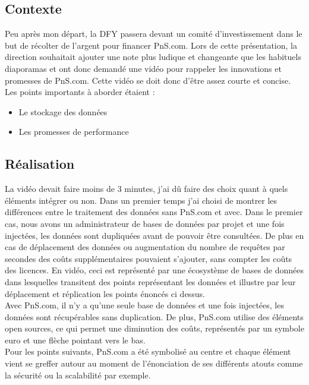 \subsection{Contexte}
Peu après mon départ, la DFY passera devant un comité d'investissement dans le but de récolter de l'argent pour financer PnS.com. Lors de cette présentation, la direction souhaitait ajouter une note plus ludique et changeante que les habituels diaporamas et ont donc demandé une vidéo pour rappeler les innovations et promesses de PnS.com. Cette vidéo se doit donc d'être assez courte et concise. Les points importants à aborder étaient : 
\begin{itemize}
\item Le stockage des données
\item Les promesses de performance
\end{itemize}




\subsection{Réalisation}
La vidéo devait faire moins de 3 minutes, j'ai dû faire des choix quant à quels éléments intégrer ou non. Dans un premier temps j'ai choisi de montrer les différences entre le traitement des données sans PnS.com et avec. Dans le premier cas, nous avons un administrateur de bases de données par projet et une fois injectées, les données sont dupliquées avant de pouvoir être consultées. De plus en cas de déplacement des données ou augmentation du nombre de requêtes par secondes des coûts supplémentaires pouvaient s'ajouter, sans compter les coûts des licences. En vidéo, ceci est représenté par une écosystème de bases de données dans lesquelles transitent des points représentant les données et illustre par leur déplacement et réplication les points énoncés ci dessus.\\

Avec PnS.com, il n'y a qu'une seule base de données et une fois injectées, les données sont récupérables sans duplication. De plus, PnS.com utilise des éléments open sources, ce qui permet une diminution des coûts, représentés par un symbole euro et une flèche pointant vers le bas.\\

Pour les points suivants, PnS.com a été symbolisé au centre et chaque élément vient se greffer autour au moment de l'énonciation de ses différents atouts comme la sécurité ou la scalabilité par exemple.


